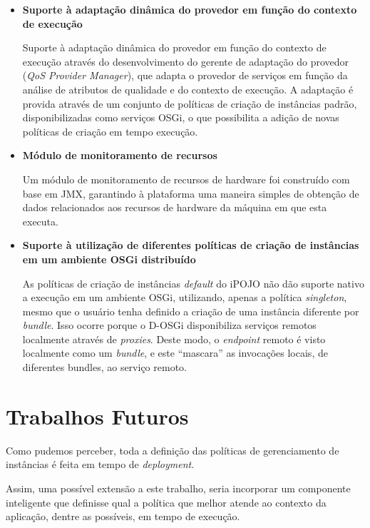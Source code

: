 \begin{itemize}

\item \textbf{Suporte à adaptação dinâmica do provedor em função do contexto de execução}

Suporte à adaptação dinâmica do provedor em função do contexto de execução através do desenvolvimento do gerente de adaptação do provedor (\textit{QoS Provider Manager}), que adapta o provedor de serviços em função da análise de atributos de qualidade e do contexto de execução. A adaptação é provida através de um conjunto de políticas de criação de instâncias padrão, disponibilizadas como serviços OSGi, o que possibilita a adição de novas políticas de criação em tempo execução.

\item \textbf{Módulo de monitoramento de recursos}

Um módulo de monitoramento de recursos de hardware foi construído com base em JMX, garantindo à plataforma uma maneira simples de obtenção de dados relacionados aos recursos de hardware da máquina em que esta executa.

\item \textbf{Suporte à utilização de diferentes políticas de criação de instâncias em um ambiente OSGi distribuído}

As políticas de criação de instâncias \textit{default} do iPOJO não dão suporte nativo a execução em um ambiente OSGi, utilizando, apenas a política \textit{singleton}, mesmo que o usuário tenha definido a criação de uma instância diferente por \textit{bundle}. Isso ocorre porque o D-OSGi disponibiliza serviços remotos localmente através de \textit{proxies}. Deste modo, o \textit{endpoint} remoto é visto localmente como um \textit{bundle}, e este ``mascara'' as invocações locais, de diferentes bundles, ao serviço remoto.

\end{itemize}

\section{Trabalhos Futuros}
Como pudemos perceber, toda a definição das políticas de gerenciamento de instâncias é feita em tempo de \textit{deployment}. 

Assim, uma possível extensão a este trabalho, seria incorporar um componente inteligente que definisse qual a política que melhor atende ao contexto da aplicação, dentre as possíveis, em tempo de execução.

